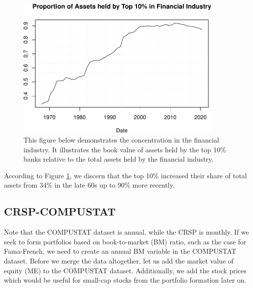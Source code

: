 \begin{Schunk}
\end{Schunk}
\begin{figure}
\caption{This figure below demonstrates the concentration in the financial industry. It illustrates the book value of assets held by the top 10\% banks relative to the total assets held by the financial industry.}
\label{fig:banks}
\begin{center}
\includegraphics[width = 4in]{CRSP_COMP_files/figure-latex/unnamed-chunk-23-1} 
\end{center}
\end{figure}

According to Figure \ref{fig:banks}, we  discern that the top 10\% increased their share of total assets from
34\% in the late 60s up to 90\% more recently.

\hypertarget{crsp-compustat}{%
\subsection{CRSP-COMPUSTAT}\label{crsp-compustat}}
Note that the COMPUSTAT dataset is annual, while the CRSP is monthly.
If we seek to form portfolios based on book-to-market (BM) ratio, such as
the case for Fama-French, we need to create an  annual BM variable in the
COMPUSTAT dataset. Before we merge the data altogether, let us add the
market value of equity (ME) to the COMPUSTAT dataset. Additionally, we
add the stock prices which would be useful for small-cap stocks
from the portfolio formation later on.

